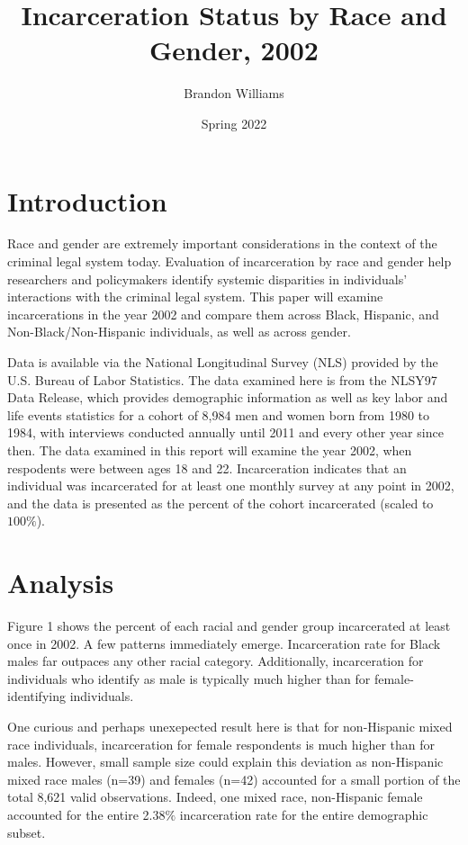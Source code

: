 \documentclass{article}
\author{Brandon Williams}
\title{Incarceration Status by Race and Gender, 2002}
\date{Spring 2022}
\begin{document}
\maketitle

\section{Introduction}

Race and gender are extremely important considerations in the context of the criminal legal system today. Evaluation of incarceration by race and gender help researchers and policymakers identify systemic disparities in individuals' interactions with the criminal legal system. This paper will examine incarcerations in the year 2002 and compare them across Black, Hispanic, and Non-Black/Non-Hispanic individuals, as well as across gender. 

Data is available via the National Longitudinal Survey (NLS) provided by the U.S. Bureau of Labor Statistics. The data examined here is from the NLSY97 Data Release, which provides demographic information as well as key labor and life events statistics for a cohort of 8,984 men and women born from 1980 to 1984, with interviews conducted annually until 2011 and every other year since then. The data examined in this report will examine the year 2002, when respodents were between ages 18 and 22. Incarceration indicates that an individual was incarcerated for at least one monthly survey at any point in 2002, and the data is presented as the percent of the cohort incarcerated (scaled to $100\%$). 

\section{Analysis}

Figure 1 shows the percent of each racial and gender group incarcerated at least once in 2002. A few patterns immediately emerge. Incarceration rate for Black males far outpaces any other racial category. Additionally, incarceration for individuals who identify as male is typically much higher than for female-identifying individuals. 

One curious and perhaps unexepected result here is that for non-Hispanic mixed race individuals, incarceration for female respondents is much higher than for males. However, small sample size could explain this deviation as non-Hispanic mixed race males (n=39) and females (n=42) accounted for a small portion of the total 8,621 valid observations. Indeed, one mixed race, non-Hispanic female accounted for the entire 2.38$\%$ incarceration rate for the entire demographic subset. 
\end{document}
